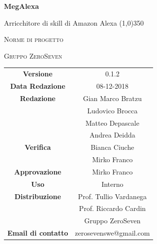 \documentclass[a4paper,12pt]{article}
\author{Bratzu Gian Marco}
\date{2018-11-28}
\begin{document}
\begin{titlepage}
	\centering
	{\huge\bfseries MegAlexa\par}
	Arricchitore di skill di Amazon Alexa
	\line(1,0){350} \\
	{\scshape\LARGE Norme di progetto \par}
	\vspace{1cm}
	{\scshape Gruppo ZeroSeven \par}
	\logo
	\begin{tabular}{c|c}
		{\hfill \textbf{Versione}} 			& 0.1.2				\\
		{\hfill\textbf{Data Redazione}} 	& 08-12-2018		\\ 
		{\hfill\textbf{Redazione}} 			&  		Gian Marco Bratzu\\&Ludovico Brocca\\&Matteo Depascale\\&Andrea Deidda\\
		{\hfill\textbf{Verifica}} 				&  	Bianca Ciuche\\& Mirko Franco	\\ 
		{\hfill\textbf{Approvazione}} 		&  		Mirko Franco			\\ 
		{\hfill\textbf{Uso}} 					& 		Interno		\\ 
		{\hfill\textbf{Distribuzione}} 			& 			Prof. Tullio Vardanega \\ & Prof. Riccardo Cardin \\ & Gruppo ZeroSeven		\\ 
		{\hfill\textbf{Email di contatto}} & zerosevenswe@gmail.com \\
	\end{tabular}
\end{titlepage}
	

	
	\label{LastFrontPage}
	\newpage	
	
	\pagestyle{mymain}
	\tableofcontents
	
	
				
	\label{LastPage}
\end{document}
